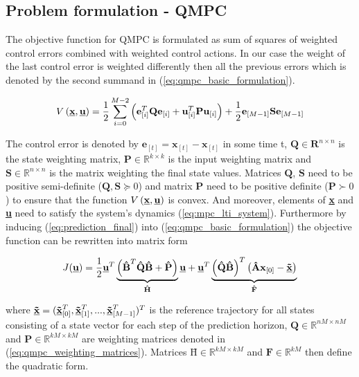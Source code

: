 \subsection{Problem formulation - QMPC}


The objective function for QMPC is formulated as sum of squares of weighted control errors combined with weighted control actions. In our case the weight of the last control error is weighted differently then all the previous errors which is denoted by the second summand in (\ref{eq:qmpc_basic_formulation}).

\begin{equation}
\label{eq:qmpc_basic_formulation}
V\left(\textbf{\underline{x}}, \textbf{\underline{u}}\right) = \frac{1}{2}\sum_{i=0}^{M-2}\left(\textbf{e}^T_{[i]}\textbf{Q}\textbf{e}_{[i]} + \textbf{u}^T_{[i]}\textbf{P}\textbf{u}_{[i]}\right) + \frac{1}{2}\textbf{e}_{[M-1]}\textbf{S}\textbf{e}_{[M-1]}
\end{equation}

The control error is denoted by $\textbf{e}_{[t]} = \textbf{x}_{[t]} - \textbf{\~x}_{[t]}$ in some time t, $\textbf{Q} \in \textbf{R}^{n\times n}$ is the state weighting matrix, $\textbf{P} \in \mathbb{R}^{k\times k}$ is the input weighting matrix and $\textbf{S} \in \mathbb{R}^{n \times n}$ is the matrix weighting the final state values. Matrices $\textbf{Q}$, $\textbf{S}$ need to be positive semi-definite ($\textbf{Q}, \textbf{S} \succeq 0$) and matrix $\textbf{P}$ need to be positive definite ($\textbf{P} \succ 0$) to ensure that the function $V\left(\textbf{\underline{x}}, \textbf{\underline{u}}\right)$ is convex. And moreover, elements of \textbf{\underline{x}} and \textbf{\underline{u}} need to satisfy the system's dynamics (\ref{eq:mpc_lti_system}). Furthermore by inducing (\ref{eq:prediction_final}) into (\ref{eq:qmpc_basic_formulation}) the objective function can be rewritten into matrix form


\begin{equation}
J(\underline{\textbf{u}}) = \frac{1}{2}\textbf{\underline{u}}^T\underbrace{\left(\textbf{\^B}^T\textbf{\^Q}\textbf{\^B} + \textbf{\^P}\right)}_{\textbf{\^H}}\textbf{\underline{u}} + \textbf{\underline{u}}^T\underbrace{\left(\textbf{\^Q}\textbf{\^B}\right)^T\left(\textbf{\^A}\textbf{x}_{[0]} - \textbf{\underline{\~x}}\right)}_{\textbf{\^F}}
\end{equation}

where $\textbf{\underline{\~x}} = (\textbf{\underline{\~x}}_{[0]}^T, \textbf{\underline{\~x}}_{[1]}^T, ..., \textbf{\underline{\~x}}_{[M-1]}^T)^T$ is the reference trajectory for all states consisting of a state vector for each step of the prediction horizon, \mbox{$\textbf{\^Q} \in \mathbb{R}^{nM \times nM}$} and $\textbf{\^P} \in \mathbb{R}^{kM\times kM}$ are weighting matrices denoted in (\ref{eq:qmpc_weighting_matrices}). Matrices $\textbf{\^H} \in \mathbb{R}^{kM\times kM}$ and $\textbf{\^F} \in \mathbb{R}^{kM}$ then define the quadratic form. 


